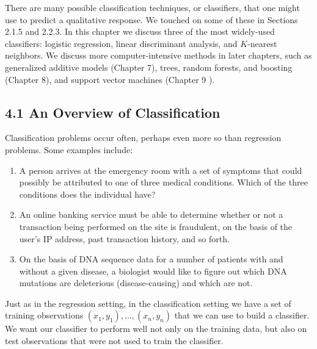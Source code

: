 \documentclass[10pt]{article}
\begin{document}
There are many possible classification techniques, or classifiers, that one might use to predict a qualitative response. We touched on some of these in Sections 2.1.5 and 2.2.3. In this chapter we discuss three of the most widely-used classifiers: logistic regression, linear discriminant analysis, and $K$-nearest neighbors. We discuss more computer-intensive methods in later chapters, such as generalized additive models (Chapter 7), trees, random forests, and boosting (Chapter 8), and support vector machines (Chapter 9 ).

\subsection*{4.1 An Overview of Classification}
Classification problems occur often, perhaps even more so than regression problems. Some examples include:

\begin{enumerate}
  \item A person arrives at the emergency room with a set of symptoms that could possibly be attributed to one of three medical conditions. Which of the three conditions does the individual have?
  \item An online banking service must be able to determine whether or not a transaction being performed on the site is fraudulent, on the basis of the user's IP address, past transaction history, and so forth.
  \item On the basis of DNA sequence data for a number of patients with and without a given disease, a biologist would like to figure out which DNA mutations are deleterious (disease-causing) and which are not.
\end{enumerate}

Just as in the regression setting, in the classification setting we have a set of training observations $\left(x_{1}, y_{1}\right), \ldots,\left(x_{n}, y_{n}\right)$ that we can use to build a classifier. We want our classifier to perform well not only on the training data, but also on test observations that were not used to train the classifier.
\end{document}
